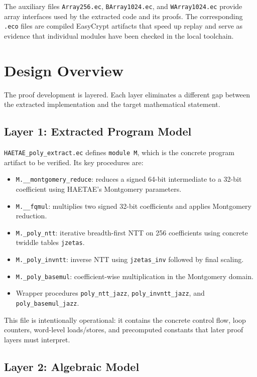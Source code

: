 \documentclass[11pt]{article}
\newcommand{\file}[1]{\texttt{#1}}
\newcommand{\ec}[1]{\texttt{#1}}
\begin{document}
The auxiliary files \file{Array256.ec}, \file{BArray1024.ec}, and
\file{WArray1024.ec} provide array interfaces used by the extracted code and
its proofs. The corresponding \file{.eco} files are compiled EasyCrypt
artifacts that speed up replay and serve as evidence that individual modules
have been checked in the local toolchain.

\section{Design Overview}

The proof development is layered. Each layer eliminates a different gap between
the extracted implementation and the target mathematical statement.

\subsection{Layer 1: Extracted Program Model}

\file{HAETAE\_poly\_extract.ec} defines \ec{module M}, which is the concrete
program artifact to be verified. Its key procedures are:
\begin{itemize}[leftmargin=1.5em]
\item \ec{M.\_\_montgomery\_reduce}: reduces a signed 64-bit intermediate to a
      32-bit coefficient using HAETAE's Montgomery parameters.
\item \ec{M.\_\_fqmul}: multiplies two signed 32-bit coefficients and applies
      Montgomery reduction.
\item \ec{M.\_poly\_ntt}: iterative breadth-first NTT on 256 coefficients using
      concrete twiddle tables \ec{jzetas}.
\item \ec{M.\_poly\_invntt}: inverse NTT using \ec{jzetas\_inv} followed by
      final scaling.
\item \ec{M.\_poly\_basemul}: coefficient-wise multiplication in the
      Montgomery domain.
\item Wrapper procedures \ec{poly\_ntt\_jazz}, \ec{poly\_invntt\_jazz}, and
      \ec{poly\_basemul\_jazz}.
\end{itemize}

This file is intentionally operational: it contains the concrete control flow,
loop counters, word-level loads/stores, and precomputed constants that later
proof layers must interpret.

\subsection{Layer 2: Algebraic Model}
\end{document}
